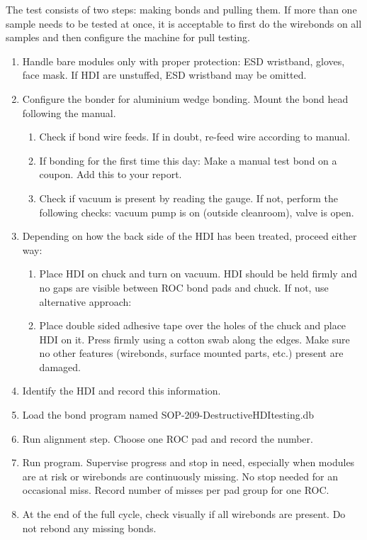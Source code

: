 \documentclass[10pt]{unlsilabsop}
\begin{document}
The test consists of two steps: making bonds and pulling them. If more than one sample needs to be tested at once, it is acceptable to first do the wirebonds on all samples and then configure the machine for pull testing.
\begin{enumerate}
    \item Handle bare modules only with proper protection: ESD wristband, gloves, face mask. If HDI are unstuffed, ESD wristband may be omitted.
    \item Configure the bonder for aluminium wedge bonding. Mount the bond head following the manual.
    \begin{enumerate}
	\item Check if bond wire feeds. If in doubt, re-feed wire according to manual.
	\item If bonding for the first time this day: Make a manual test bond on a coupon. Add this to your report.
	\item Check if vacuum is present by reading the gauge. If not, perform the following checks: vacuum pump is on (outside cleanroom), valve is open.
    \end{enumerate}
    \item Depending on how the back side of the HDI has been treated, proceed either way:
    \begin{enumerate}
	\item Place HDI on chuck and turn on vacuum. HDI should be held firmly and no gaps are visible between ROC bond pads and chuck. If not, use alternative approach:
	\item Place double sided adhesive tape over the holes of the chuck and place HDI on it. Press firmly using a cotton swab along the edges. Make sure no other features (wirebonds, surface mounted parts, etc.) present are damaged.
    \end{enumerate}
    \item Identify the HDI and record this information.
    \item Load the bond program named SOP-209-DestructiveHDItesting.db
    \item Run alignment step. Choose one ROC pad and record the number.
    \item Run program. Supervise progress and stop in need, especially when modules are at risk or wirebonds are continuously missing. No stop needed for an occasional miss. Record number of misses per pad group for one ROC.
    \item At the end of the full cycle, check visually if all wirebonds are present. Do not rebond any missing bonds.

\end{enumerate}
\end{document}
